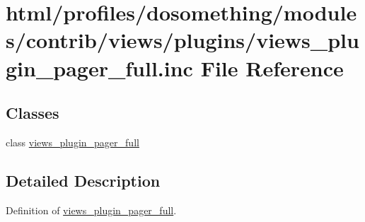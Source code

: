 \hypertarget{views__plugin__pager__full_8inc}{
\section{html/profiles/dosomething/modules/contrib/views/plugins/views\_\-plugin\_\-pager\_\-full.inc File Reference}
\label{views__plugin__pager__full_8inc}
}
\subsection*{Classes}
\begin{DoxyCompactItemize}
\item 
class \hyperlink{classviews__plugin__pager__full}{views\_\-plugin\_\-pager\_\-full}
\end{DoxyCompactItemize}


\subsection{Detailed Description}
Definition of \hyperlink{classviews__plugin__pager__full}{views\_\-plugin\_\-pager\_\-full}. 